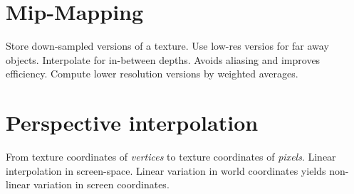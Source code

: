 \begin{compactdesc}
\section{Mip-Mapping}
Store down-sampled versions of a texture. Use low-res versios for far away objects. Interpolate for in-between depths. Avoids aliasing and improves efficiency. Compute lower resolution versions by weighted averages.
\section{Perspective interpolation}
From texture coordinates of \emph{vertices} to texture coordinates of \emph{pixels}. Linear interpolation in screen-space. 
	Linear variation in world coordinates yields non-linear variation in screen coordinates.
\end{compactdesc}
